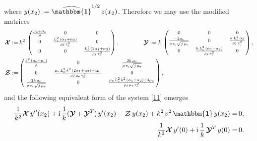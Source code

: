 \documentclass[10pt]{article}
\newcommand{\id}{{\mathbf{\mathbbm{1}}}}
\begin{document}
 where  $y(x_2):=\widehat{\id}^{1/2}\,z(x_2)$. Therefore we  {may} use the modified matrices
 \begin{align}\label{nTQ}
 \boldsymbol{\mathcal{X}}:=&\,k^2\,\begin{footnotesize}\begin{pmatrix}  \frac{\mu_{\rm e} +\mu_{\rm c}}{\rho} &0	&0
 	\\
 	0& \frac{L_{\rm c}^2\,(\alpha_1+\alpha_2)}{\rho j\,\tau_{\rm c}^2} 
 	&0
 	\\0
 	& 0 & \frac{{L_{\rm c}^2}\,(2\alpha_1+\alpha_3)}{\rho j\,\tau_{\rm c}^2} \end{pmatrix}\end{footnotesize}, \qquad \qquad 
\boldsymbol{\mathcal{Y}}:= k\,\begin{footnotesize}\begin{pmatrix}  0& 0 & 0
 	\\
 	\frac{-2\mu_{\rm c}}{{\rho\,\tau_{\rm c}\sqrt{j\,\mu_{\rm e}}}} & 0 
 	& \frac{k{\,L_{\rm c}^2}\,\alpha_3}{\rho j\,\tau_{\rm c}^2}
 	\\0  
 	& \frac{k{\,L_{\rm c}^2}\,(\alpha_1-\alpha_2)}{\rho j\,\tau_{\rm c}^2} & 0 \end{pmatrix}\end{footnotesize},\notag\\
\boldsymbol{\mathcal{Z}}:=&\begin{footnotesize}\begin{pmatrix} \frac{k^2\,(\mu_{\rm e} +\mu_{\rm c} )}{\rho} & 0	& \frac{2k\,\mu_{\rm c}}{{\rho\,\tau_{\rm c}\sqrt{j\,\mu_{\rm e}}}}
 	\\
 	0 & \frac{{\mu_{\rm e}\,L_{\rm c}^2}\,k^2\,(2\alpha_1+\alpha_3)+4 \mu_{\rm c}}{\rho j\,\mu_{\rm e}\,\tau_{\rm c}^2}
 	& 0
 	\\\frac{2k\,\mu_{\rm c}}{{\rho\,\tau_{\rm c}\sqrt{j\,\mu_{\rm e}}}}
 	& 0 & \frac{{\mu_{\rm e}\,L_{\rm c}^2}\,k^2\,(\alpha_1+\alpha_2)+4 \mu_{\rm c}}{\rho j\,\mu_{\rm e}\,\tau_{\rm c}^2} \, \end{pmatrix}\end{footnotesize},
 \end{align}
 and the following equivalent form of the system \eqref{11} emerges
 \begin{align}\label{n11}
 \frac{1}{k^2}\boldsymbol{\mathcal{X}}\,y''(x_2)+ {\rm i}\,\frac{1}{k} (\boldsymbol{\mathcal{Y}}+\boldsymbol{\mathcal{Y}}^T)\,y'(x_2)-\boldsymbol{\mathcal{Z}}\,y(x_2)+k^2\, v^2 \, \id\,y(x_2)=&\,0,\\
 \frac{1}{k^2}\boldsymbol{\mathcal{X}}\,y'(0)+ {\rm i}\,\frac{1}{k} \,\boldsymbol{\mathcal{Y}}^T\,y(0)=&\,0.\notag
 \end{align}
 
\end{document}
